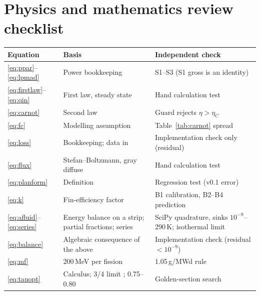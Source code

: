\documentclass[11pt]{article}
\numberwithin{equation}{section}
\numberwithin{table}{section}
\begin{document}
\appendix
\section{Physics and mathematics review checklist}
\begin{center}
\small
\begin{tabularx}{\textwidth}{lXX}
\toprule
Equation & Basis & Independent check \\
\midrule
\eqref{eq:ppar}--\eqref{eq:lpmad} & Power bookkeeping & S1--S3 (S1 gross is an identity) \\
\eqref{eq:firstlaw}--\eqref{eq:qin} & First law, steady state & Hand calculation test \\
\eqref{eq:carnot} & Second law \cite{smith2001thermo} & Guard rejects $\eta>\eta_C$ \\
\eqref{eq:fc} & Modelling assumption & Table~\ref{tab:carnot} spread \\
\eqref{eq:loss} & Bookkeeping; data in \cite{oleson2022deployable} & Implementation check only (residual) \\
\eqref{eq:flux} & Stefan--Boltzmann, gray diffuse \cite{howell2021radiation} & Hand calculation test \\
\eqref{eq:planform} & Definition \cite{fsp2010icd,mason2025trades} & Regression test (v0.1 error) \\
\eqref{eq:k} & Fin-efficiency factor \cite{wang2021entropy,gilmore2002thermal} & B1 calibration, B2--B4 prediction \\
\eqref{eq:afluid}--\eqref{eq:series} & Energy balance on a strip; partial fractions; series & SciPy quadrature, sinks $10^{-9}$--290\,K; isothermal limit \\
\eqref{eq:balance} & Algebraic consequence of the above & Implementation check (residual $<10^{-9}$) \\
\eqref{eq:mf} & 200\,MeV per fission \cite{lamarsh2017} & 1.05\,g/MWd rule \\
\eqref{eq:tauopt} & Calculus; 3/4 limit \cite{bucher1960}; 0.75--0.80 \cite{wetch1988mcnsps} & Golden-section search \\
\bottomrule
\end{tabularx}
\end{center}

\end{document}
